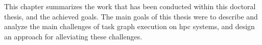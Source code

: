 This chapter summarizes the work that has been conducted within this doctoral thesis, and the
achieved goals. The main goals of this thesis were to describe and analyze the main challenges of
task graph execution on \gls{hpc} systems, and design an approach for alleviating these
challenges.
